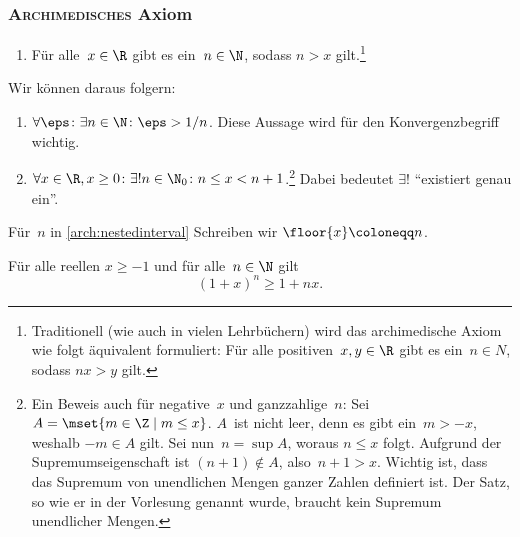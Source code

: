 \documentclass[a4paper]{article}
\begin{document}
\subsubsection{\textsc{Archimedisches} Axiom}

\begin{axiom}\leavevmode
    \begin{enumerate}[resume*=axioms]
        \item Für alle~$x \in \R$ gibt es ein~$n \in \N$, sodass $n > x$ gilt.\footnote{Traditionell (wie auch in vielen Lehrbüchern) wird das archimedische Axiom wie folgt äquivalent formuliert: Für alle positiven~$x, y \in \R$ gibt es ein~$n \in N$, sodass $nx > y$ gilt.}
    \end{enumerate}
\end{axiom}

Wir können daraus folgern:
\begin{enumerate}[resume*=conclusions]
    \item $\forall \eps\colon \exists n \in \N\colon \eps > 1/n$. Diese Aussage wird für den Konvergenzbegriff wichtig.\label{arch:inverse}
    \item $\forall x \in \R, x \geq 0\colon \exists! n \in \N_0\colon n \leq x < n+1$.\footnote{Ein Beweis auch für negative~$x$ und ganzzahlige~$n$: Sei $A = \mset{m \in \Z \mid m \leq x}$. $A$~ist nicht leer, denn es gibt ein~$m > -x$, weshalb $-m \in A$ gilt. Sei nun~$n = \sup A$, woraus $n \leq x$ folgt. Aufgrund der Supremumseigenschaft ist $(n+1) \notin A$, also~$n+1 > x$. Wichtig ist, dass das Supremum von unendlichen Mengen ganzer Zahlen definiert ist. Der Satz, so wie er in der Vorlesung genannt wurde, braucht kein Supremum unendlicher Mengen.} Dabei bedeutet $\exists!$ "`existiert genau ein"'.\label{arch:nestedinterval}
\end{enumerate}

\begin{notation}
    Für~$n$ in \cref{arch:nestedinterval} Schreiben wir $\floor{x} \coloneqq n$.
\end{notation}

\begin{theorem}\label{thm:bernoulliineq}
    Für alle reellen $x \geq -1$ und für alle~$n \in \N$ gilt
    \begin{equation*}
        (1 + x)^n \geq 1 + nx.
    \end{equation*}
\end{theorem}
\end{document}
